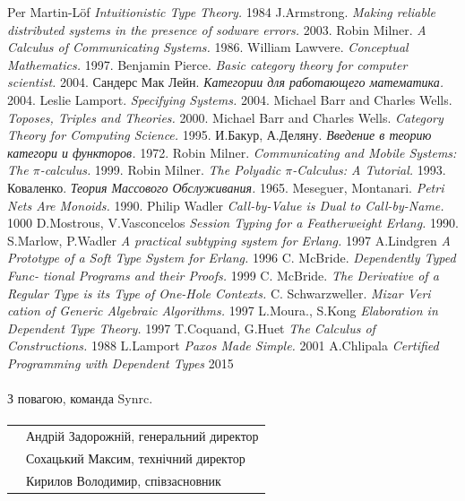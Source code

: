\documentclass[11pt,oneside]{article}
\begin{document}
\newpage
\begin{thebibliography}{9}

      Per Martin-Löf \textit{Intuitionistic Type Theory.} 1984
      J.Armstrong. \textit{Making reliable distributed systems in the presence of sodware errors.} 2003.
     Robin Milner. \textit{ A Calculus of Communicating Systems.} 1986.
  William Lawvere. \textit{Conceptual Mathematics.} 1997.
   Benjamin Pierce. \textit{Basic category theory for computer scientist.} 2004.
   Сандерс Мак Лейн. \textit{Категории для работающего математика.} 2004.
      Leslie Lamport. \textit{Specifying Systems.} 2004.
  Michael Barr and Charles Wells. \textit{Toposes, Triples and Theories.} 2000.
  Michael Barr and Charles Wells. \textit{Category Theory for Computing Science.} 1995.
    И.Бакур, А.Деляну. \textit{Введение в теорию категори и функторов.} 1972.
   Robin Milner. \textit{Communicating and Mobile Systems: The $\pi$-calculus.} 1999.
   Robin Milner. \textit{The Polyadic $\pi$-Calculus: A Tutorial.} 1993.
     Коваленко. \textit{Теория Массового Обслуживания.} 1965.
 Meseguer, Montanari.  \textit{Petri Nets Are Monoids.} 1990.
  Philip Wadler \textit{Call-by-Value is Dual to Call-by-Name.} 1000
   D.Mostrous, V.Vasconcelos \textit{Session Typing for a Featherweight Erlang.} 1990.
   S.Marlow, P.Wadler \textit{A practical subtyping system for Erlang.} 1997
   A.Lindgren \textit{A Prototype of a Soft Type System for Erlang.} 1996
  C. McBride. \textit{Dependently Typed Func- tional Programs and their Proofs.} 1999
 C. McBride. \textit{The Derivative of a Regular Type is its Type of One-Hole Contexts.}
  C. Schwarzweller. \textit{Mizar Veri cation of Generic Algebraic Algorithms.} 1997
  L.Moura., S.Kong \textit{Elaboration in Dependent Type Theory.} 1997
  T.Coquand, G.Huet \textit{The Calculus of Constructions.} 1988
   L.Lamport \textit{Paxos Made Simple.} 2001
   A.Chlipala \textit{Certified Programming with Dependent Types} 2015
\end{thebibliography}

\vspace{3\baselineskip}
\paragraph{}
З повагою, команда Synrc.
\paragraph{}
\vspace{3\baselineskip}
\begin{tabular}{ll}
        & Андрій Задорожній, генеральний директор \\
        & Сохацький Максим, технічний директор \\
        & Кирилов Володимир, співзасновник
\end{tabular}
\end{document}
